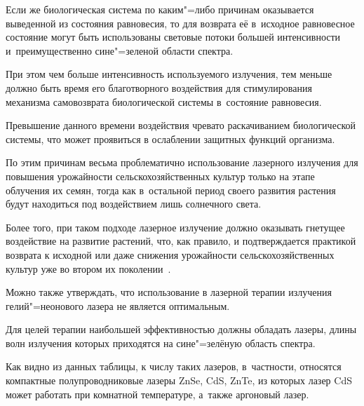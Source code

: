 Если же биологическая система по каким"=либо причинам оказывается выведенной из состояния равновесия, то для возврата её в~исходное равновесное состояние могут быть использованы световые потоки большей интенсивности и~преимущественно сине"=зеленой области спектра. 

При этом чем больше интенсивность используемого излучения, тем меньше должно быть время его благотворного воздействия для стимулирования механизма самовозврата биологической системы в~состояние равновесия.

Превышение данного времени воздействия чревато раскачиванием биологической системы, что может проявиться в ослаблении защитных функций организма.



По этим причинам весьма проблематично использование лазерного излучения для повышения урожайности сельскохозяйственных культур только на этапе облучения их семян, тогда как в~остальной период своего развития растения будут находиться под воздействием лишь солнечного света. 

Более того, при таком подходе лазерное излучение должно оказывать гнетущее воздействие на развитие растений, что, как правило, и подтверждается практикой возврата к исходной или даже снижения урожайности сельскохозяйственных культур уже во втором их поколении~\cite{gur:bib:3}.



Можно также утверждать, что использование в лазерной терапии излучения гелий"=неонового лазера не является оптимальным. 

Для целей терапии наибольшей эффективностью должны обладать лазеры, длины волн излучения которых приходятся на сине"=зелёную область спектра. 

Как видно из данных таблицы, к числу таких лазеров, в~частности, относятся компактные полупроводниковые лазеры ZnSe, CdS, ZnTe, из которых лазер CdS может работать при комнатной температуре, а~также аргоновый лазер.



